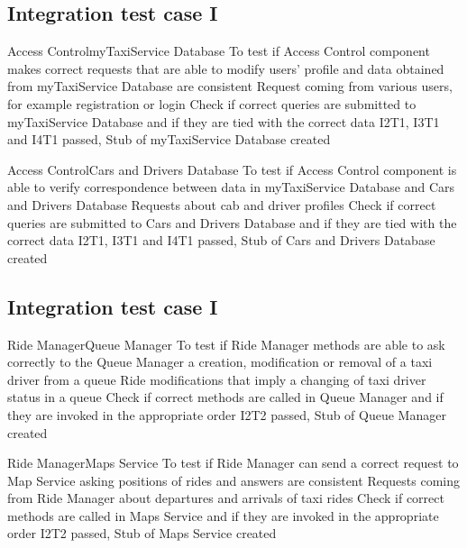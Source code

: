 
\subsection{Integration test case I}
\setcounter{testcounter}{1}
{Access Control\textrightarrow myTaxiService Database}
{To test if Access Control component makes correct requests that are able to modify users' profile and data obtained from myTaxiService Database are consistent}
{Request coming from various users, for example registration or login}
{Check if correct queries are submitted to myTaxiService Database and if they are tied with the correct data}
{I2T1, I3T1 and I4T1 passed, Stub of myTaxiService Database created}

\vspace{2ex}
{Access Control\textrightarrow Cars and Drivers Database}
{To test if Access Control component is able to verify correspondence between data in myTaxiService Database and Cars and Drivers Database}
{Requests about cab and driver profiles}
{Check if correct queries are submitted to Cars and Drivers Database and if they are tied with the correct data}
{I2T1, I3T1 and I4T1 passed, Stub of Cars and Drivers Database created}


\subsection{Integration test case I}
\setcounter{testcounter}{1}
{Ride Manager\textrightarrow Queue Manager}
{To test if Ride Manager methods are able to ask correctly to the Queue Manager a creation, modification or removal of a taxi driver from a queue}
{Ride modifications that imply a changing of taxi driver status in a queue}
{Check if correct methods are called in Queue Manager and if they are invoked in the appropriate order}
{I2T2 passed, Stub of Queue Manager created}

\vspace{2ex}
{Ride Manager\textrightarrow Maps Service}
{To test if Ride Manager can send a correct request to Map Service asking positions of rides and answers are consistent}
{Requests coming from Ride Manager about departures and arrivals of taxi rides}
{Check if correct methods are called in Maps Service and if they are invoked in the appropriate order}
{I2T2 passed, Stub of Maps Service created}
